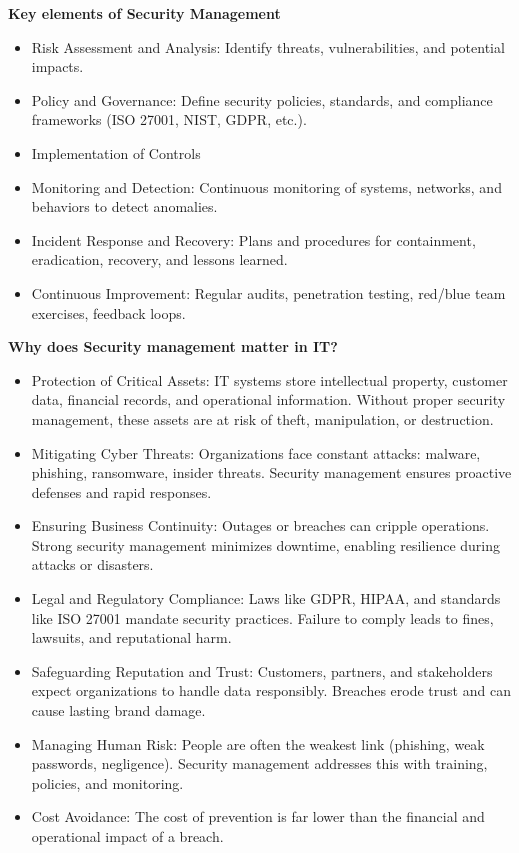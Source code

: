 \bigskip

\noindent \textbf{Key elements of Security Management}

\begin{itemize}
    \item Risk Assessment and Analysis: Identify threats, vulnerabilities, and potential impacts.
    \item Policy and Governance: Define security policies, standards, and compliance frameworks (ISO 27001, NIST, GDPR, etc.).
    \item Implementation of Controls
    \item Monitoring and Detection: Continuous monitoring of systems, networks, and behaviors to detect anomalies.
    \item Incident Response and Recovery: Plans and procedures for containment, eradication, recovery, and lessons learned.
    \item Continuous Improvement: Regular audits, penetration testing, red/blue team exercises, feedback loops.
\end{itemize}

\bigskip 

\noindent\textbf{Why does Security management matter in IT?}

\begin{itemize}
    \item Protection of Critical Assets: IT systems store intellectual property, customer data, financial records, and operational information. Without proper security management, these assets are at risk of theft, manipulation, or destruction.
    \item Mitigating Cyber Threats: Organizations face constant attacks: malware, phishing, ransomware, insider threats. Security management ensures proactive defenses and rapid responses.
    \item Ensuring Business Continuity: Outages or breaches can cripple operations. Strong security management minimizes downtime, enabling resilience during attacks or disasters.
    \item Legal and Regulatory Compliance: Laws like GDPR, HIPAA, and standards like ISO 27001 mandate security practices. Failure to comply leads to fines, lawsuits, and reputational harm.
    \item Safeguarding Reputation and Trust: Customers, partners, and stakeholders expect organizations to handle data responsibly. Breaches erode trust and can cause lasting brand damage.
    \item Managing Human Risk: People are often the weakest link (phishing, weak passwords, negligence). Security management addresses this with training, policies, and monitoring.
    \item Cost Avoidance: The cost of prevention is far lower than the financial and operational impact of a breach.
\end{itemize}

